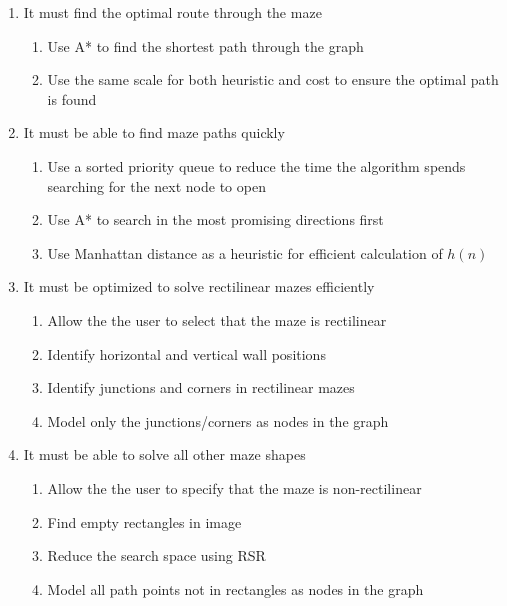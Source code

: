 \documentclass[titlepage]{article}
\begin{document}
\begin{enumerate} [{Need }1:]
\begin{enumerate} [{Obj 4.}1:]
\item Save the solved maze as an image file in the same file format as the original 
\item The saved image should be of the same dimensions and have a related file name, in the form Example-path.png (where Example.png was the original file name)
\end{enumerate}
\item It must find the optimal route through the maze
\begin{enumerate} [{Obj 5.}1:]
\item Use A* to find the shortest path through the graph
\item Use the same scale for both heuristic and cost to ensure the optimal path is found
\end{enumerate}
\item It must be able to find maze paths quickly
\begin{enumerate} [{Obj 6.}1:]
\item Use a sorted priority queue to reduce the time the algorithm spends searching for the next node to open
\item Use A* to search in the most promising directions first
\item Use Manhattan distance as a heuristic for efficient calculation of $h(n)$
\end{enumerate}
\item It must be optimized to solve rectilinear mazes efficiently
\begin{enumerate} [{Obj 7.}1:]
\item Allow the the user to select that the maze is rectilinear
\item Identify horizontal and vertical wall positions
\item Identify junctions and corners in rectilinear mazes
\item Model only the junctions/corners as nodes in the graph
\end{enumerate}
\item It must be able to solve all other maze shapes
\begin{enumerate} [{Obj 8.}1:]
\item Allow the the user to specify that the maze is non-rectilinear
\item Find empty rectangles in image
\item Reduce the search space using RSR
\item Model all path points not in rectangles as nodes in the graph
\end{enumerate}

\end{enumerate}
\end{document}
